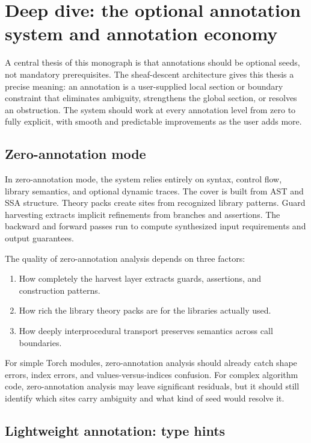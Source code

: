 \documentclass[11pt]{report}
\theoremstyle{definition}
\theoremstyle{plain}
\begin{document}
\section{Deep dive: the optional annotation system and annotation economy}

A central thesis of this monograph is that annotations should be optional seeds,
not mandatory prerequisites. The sheaf-descent architecture gives this thesis a
precise meaning: an annotation is a user-supplied local section or boundary
constraint that eliminates ambiguity, strengthens the global section, or
resolves an obstruction. The system should work at every annotation level from
zero to fully explicit, with smooth and predictable improvements as the user
adds more.

\subsection{Zero-annotation mode}

In zero-annotation mode, the system relies entirely on syntax, control flow,
library semantics, and optional dynamic traces. The cover is built from AST
and SSA structure. Theory packs create sites from recognized library patterns.
Guard harvesting extracts implicit refinements from branches and assertions.
The backward and forward passes run to compute synthesized input requirements
and output guarantees.

The quality of zero-annotation analysis depends on three factors:
\begin{enumerate}[nosep]
  \item How completely the harvest layer extracts guards, assertions, and
        construction patterns.
  \item How rich the library theory packs are for the libraries actually used.
  \item How deeply interprocedural transport preserves semantics across call
        boundaries.
\end{enumerate}

For simple Torch modules, zero-annotation analysis should already catch shape
errors, index errors, and values-versus-indices confusion. For complex
algorithm code, zero-annotation analysis may leave significant residuals, but
it should still identify which sites carry ambiguity and what kind of seed
would resolve it.

\subsection{Lightweight annotation: type hints}
\end{document}
